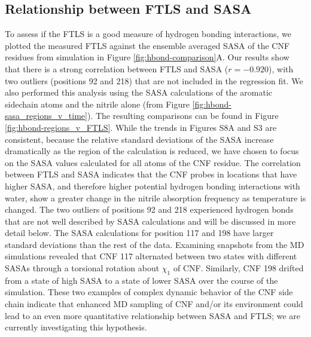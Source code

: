 \subsection{Relationship between FTLS and SASA}

To assess if the FTLS is a good measure of hydrogen bonding interactions, we plotted the measured FTLS against the ensemble averaged SASA of the CNF residues from simulation in Figure \ref{fig:hbond-comparison}A.
Our results show that there is a strong correlation between FTLS and SASA ($r = -0.920$), with two outliers (positions 92 and 218) that are not included in the regression fit.
We also performed this analysis using the SASA calculations of the aromatic sidechain atoms and the nitrile alone (from Figure \ref{fig:hbond-sasa_regions_v_time}).
The resulting comparisons can be found in Figure \ref{fig:hbond-regions_v_FTLS}. 
While the trends in Figures S8A and S3 are consistent, because the relative standard deviations of the SASA increase dramatically as the region of the calculation is reduced, we have chosen to focus on the SASA values calculated for all atoms of the CNF residue.
The correlation between FTLS and SASA indicates that the CNF probes in locations that have higher SASA, and therefore higher potential hydrogen bonding interactions with water, show a greater change in the nitrile absorption frequency as temperature is changed.
The two outliers of positions 92 and 218 experienced hydrogen bonds that are not well described by SASA calculations and will be discussed in more detail below.
The SASA calculations for position 117 and 198 have larger standard deviations than the rest of the data.
Examining snapshots from the MD simulations revealed that CNF 117 alternated between two states with different SASAs through a torsional rotation about $\chi_1$ of CNF.
Similarly, CNF 198 drifted from a state of high SASA to a state of lower SASA over the course of the simulation.
These two examples of complex dynamic behavior of the CNF side chain indicate that enhanced MD sampling of CNF and/or its environment could lead to an even more quantitative relationship between SASA and FTLS; we are currently investigating this hypothesis. 

